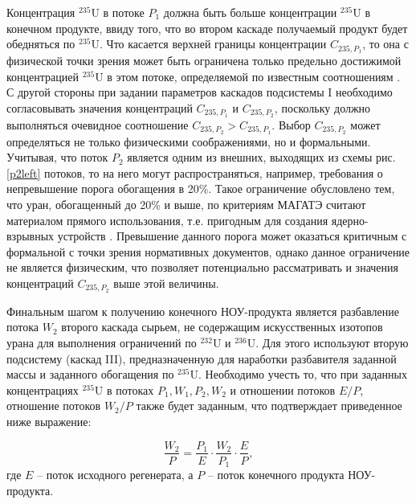\newpage

Концентрация $^{235}$U в потоке $P_1$ должна быть больше концентрации $^{235}$U в конечном продукте, ввиду того, что во втором каскаде получаемый продукт будет обедняться по $^{235}$U. Что касается верхней границы концентрации ${C}_{235,{P_1}}$, то она с физической точки зрения может быть ограничена только предельно достижимой концентрацией $^{235}$U в этом потоке, определяемой по известным соотношениям \cite{minenkoPredelnoeObogashcheniePromezhutochnyh1972,sulaberidzeOsobennostiObogashcheniyaKomponentov2006}. С другой стороны при задании параметров каскадов подсистемы I необходимо согласовывать значения концентраций ${C}_{235,{P_1}}$ и ${C}_{235,{P_2}}$, поскольку должно выполняться очевидное соотношение ${C}_{235,{P_2}}{>}{C}_{235,{P_1}}$.
Выбор $C_{235,{P_2}}$ может определяться не только физическими соображениями, но и формальными. Учитывая, что поток $P_2$ является одним из внешних, выходящих из схемы рис. \ref{p2left} потоков, то на него могут распространяться, например, требования о непревышение порога обогащения в 20\%. Такое ограничение обусловлено тем, что уран, обогащенный до 20\% и выше, по критериям МАГАТЭ считают материалом прямого использования, т.е. пригодным для создания ядерно-взрывных устройств \cite{brownOriginsSignificanceLimit2016,pshakinYadernoeNerasprostranenie2006}. Превышение данного порога может оказаться критичным с формальной с точки зрения нормативных документов, однако данное ограничение не является физическим, что позволяет потенциально рассматривать и значения концентраций  $C_{235,{P_2}}$ выше этой величины. 

Финальным шагом к получению конечного НОУ-продукта является разбавление потока $W_2$ второго каскада сырьем, не содержащим искусственных изотопов урана для выполнения ограничений по $^{232}$U и $^{236}$U.
Для этого используют вторую подсистему (каскад III), предназначенную для наработки разбавителя заданной массы и заданного обогащения по $^{235}$U.
Необходимо учесть то, что при заданных концентрациях $^{235}$U в потоках ${P_1}, {W_1}, {P_2}, {W_2}$ и отношении потоков $E/P$, отношение потоков ${W_2}{/P}$ также будет заданным, что подтверждает приведенное ниже выражение:

\begin{equation}
    \label{dc1}
    \frac{W_{2}}{P}=\frac{P_{1}}{E}\cdot\frac{W_{2}}{P_{1}}\cdot\frac{E}{P},
\end{equation}
где $E$ -- поток исходного регенерата, а $P$ -- поток конечного продукта НОУ-продукта.

